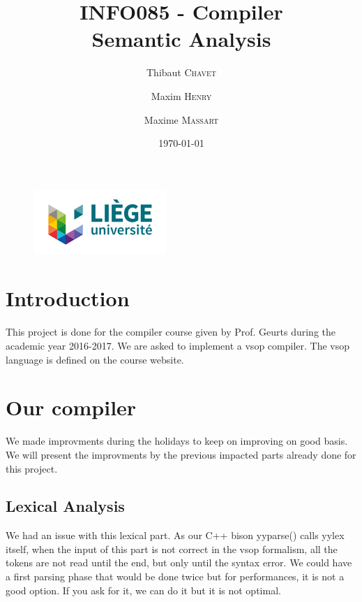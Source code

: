 \documentclass[a4paper,11pt]{article}
\title{INFO085 - Compiler \\ Semantic Analysis }
\date{\today}
\author{Thibaut \textsc{Chavet} \and Maxim \textsc{Henry} \and Maxime \textsc{Massart}}
\begin{document}
\begin{figure}
\begin{center}
\includegraphics[scale = 1.2]{logoulg}
\end{center}
\end{figure}

\maketitle
\thispagestyle{empty}
\setcounter{page}{0}

% 
% 
% 
% 
% 
% 

\section{Introduction}
This project is done for the compiler course given by Prof. Geurts during the academic year 2016-2017. 
We are asked to implement a vsop compiler. The vsop language is defined on the course website.

\section{Our compiler}
We made improvments during the holidays to keep on improving on good basis. We will present the improvments
by the previous impacted parts already done for this project.

\subsection{Lexical Analysis}
We had an issue with this lexical part. As our C++ bison yyparse() calls yylex itself, when the input of this part is not correct in the vsop formalism, all the tokens are not read until the end, but only until the syntax error. We could have a first parsing phase that would be done twice
but for performances, it is not a good option. If you ask for it, we can do it but it is not optimal.
\end{document}
